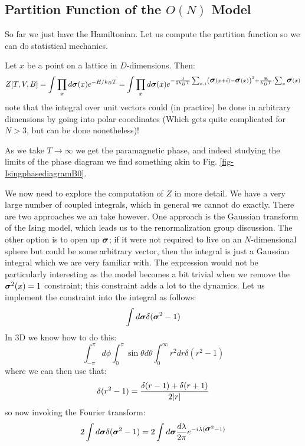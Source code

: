 \subsection{Partition Function of the $O(N)$ Model}
So far we just have the Hamiltonian. Let us compute the partition function so we can do statistical mechanics.

Let $x$ be a point on a lattice in $D$-dimensions. Then:
\begin{equation}
    Z[T, V, B] = \int \prod_x d\mbox{\boldmath$ \sigma $}(x) e^{-H/k_B T} = \int \prod_x d\mbox{\boldmath$ \sigma $}(x) e^{- \frac{J}{2k_B T}\sum_{x, i}\left(\mbox{\boldmath$ \sigma $}(x + i) - \mbox{\boldmath$ \sigma $}(x)\right)^2 + \frac{\mathbf{B}}{k_B T} \cdot \sum_x \mbox{\boldmath$ \sigma $}(x)}
\end{equation}
note that the integral over unit vectors could (in practice) be done in arbitrary dimensions by going into polar coordinates (Which gets quite complicated for $N > 3$, but can be done nonetheless)!

As we take $T \to \infty$ we get the paramagnetic phase, and indeed studying the limits of the phase diagram we find something akin to Fig. \ref{fig-IsingphasediagramB0}. 

We now need to explore the computation of $Z$ in more detail. We have a very large number of coupled integrals, which in general we cannot do exactly. There are two approaches we an take however. One approach is the Gaussian transform of the Ising model, which leads us to the renormalization group discussion. The other option is to open up $\mbox{\boldmath$ \sigma $}$; if it were not required to live on an $N$-dimensional sphere but could be some arbitrary vector, then the integral is just a Gaussian integral which we are very familiar with. The expression would not be particularly interesting as the model becomes a bit trivial when we remove the $\mbox{\boldmath$ \sigma $}^2(x) = 1$ constraint; this constraint adds a lot to the dynamics. Let us implement the constraint into the integral as follows:
\begin{equation}
    \int d\mbox{\boldmath$ \sigma $} \delta(\mbox{\boldmath$ \sigma $}^2 - 1)
\end{equation}
In 3D we know how to do this:
\begin{equation}
    \int_{-\pi}^\pi d\phi \int_0^\pi \sin\theta d\theta \int_0^\infty r^2 dr \delta(r^2 - 1)
\end{equation}
where we can then use that:
\begin{equation}
    \delta(r^2 - 1) = \frac{\delta(r - 1) + \delta(r + 1)}{2\lvert r \rvert}
\end{equation}
so now invoking the Fourier transform:
\begin{equation}
    2\int d\mbox{\boldmath$ \sigma $}\delta(\mbox{\boldmath$ \sigma $}^2 - 1) = 2\int d\mbox{\boldmath$ \sigma $} \frac{d\lambda}{2\pi}e^{-i\lambda(\mbox{\boldmath$ \sigma $}^2 -1)}
\end{equation}


